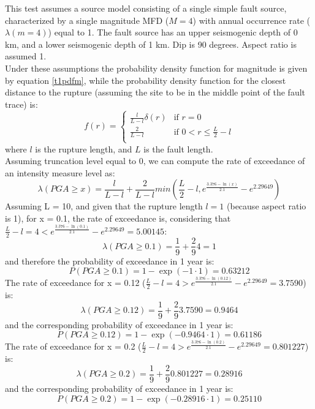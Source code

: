 This test assumes a source model
consisting of a single simple fault source, characterized by a single magnitude
MFD ($M=4$) with annual occurrence rate ($\lambda(m=4)$) equal to 1. The fault
source has an upper seismogenic depth of 0 km, and a lower seismogenic depth of
1 km.  Dip is 90 degrees. Aspect ratio is assumed 1.\\ Under these assumptions
the probability density function for magnitude is given by equation
\ref{t1pdfm}, while the probability density function for the closest distance
to the rupture (assuming the site to be in the middle point of the fault trace)
is:
\begin{equation}
f(r) = 
\begin{cases}
\frac{l}{L- l}\delta(r)    &    \text{if } r = 0 \\
\frac{2}{L-l}    &    \text{if } 0 < r \leq \frac{L}{2} - l \\
\end{cases}
\end{equation}
where $l$ is the rupture length, and $L$ is the fault length.\\
Assuming truncation level equal to 0, we can compute the rate of exceedance of
an intensity measure level as:
\begin{equation}
\lambda(PGA \geq x) = \frac{l}{L-l} + \frac{2}{L-l}min(\frac{L}{2} - l,
e^{\frac{3.376 - \ln(x)}{2.1}} - e^{2.29649})
\end{equation}
Assuming L = 10, and given that the rupture length $l=1$ (because aspect ratio is 1), for x = 0.1, the rate of exceedance is,
considering that $\frac{L}{2} - l = 4 < e^{\frac{3.376 - \ln(0.1)}{2.1}} - e^{2.29649} = 5.00145$:
\begin{equation}
\lambda(PGA \geq 0.1) = \frac{1}{9} + \frac{2}{9}4 = 1
\end{equation}
and therefore the probability of exceedance in 1 year is:
\begin{equation}
P(PGA \geq 0.1) = 1 - \exp(- 1\cdot 1) = 0.63212
\end{equation}
The rate of exceedance for x = 0.12 ($\frac{L}{2} - l = 4 > e^{\frac{3.376 - \ln(0.12)}{2.1}} - e^{2.29649} = 3.7590$) is:
\begin{equation}
\lambda(PGA \geq 0.12) = \frac{1}{9} + \frac{2}{9}3.7590 = 0.9464
\end{equation}
and the corresponding probability of exceedance in 1 year is:
\begin{equation}
P(PGA \geq 0.12) = 1 - \exp(- 0.9464 \cdot 1) = 0.61186
\end{equation}
The rate of exceedance for x = 0.2 ($\frac{L}{2} - l = 4 > e^{\frac{3.376 - \ln(0.2)}{2.1}} - e^{2.29649} = 0.801227$) is:
\begin{equation}
\lambda(PGA \geq 0.2) = \frac{1}{9} + \frac{2}{9}0.801227 = 0.28916
\end{equation}
and the corresponding probability of exceedance in 1 year is:
\begin{equation}
P(PGA \geq 0.2) = 1 - \exp(- 0.28916 \cdot 1) = 0.25110
\end{equation}
%
\clearpage
%
